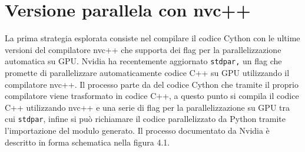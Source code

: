 \documentclass[12pt,a4paper]{report}
\begin{document}
\chapter{Versione parallela con nvc++} 
La prima strategia esplorata consiste nel compilare il codice Cython con le ultime versioni del compilatore nvc++ che supporta dei flag per la parallelizzazione automatica su GPU.  Nvidia ha recentemente aggiornato \verb|stdpar,|  un flag che promette di parallelizzare automaticamente codice C++ su GPU utilizzando il compilatore nvc++. \newline
Il processo parte da del codice Cython che tramite il proprio compilatore viene trasformato in codice C++,  a questo punto si compila il codice C++ utilizzando nvc++ e una serie di flag per la parallelizzazione su GPU tra cui \verb|stdpar|, infine si può richiamare il codice parallelizzato da Python tramite l'importazione del modulo generato. \newline
Il processo documentato da Nvidia è descritto in forma schematica nella figura 4.1.
\begin{figure}[H]
\centering
\begin{floatrow}[1]
\end{floatrow}
\end{figure} \newpage
\end{document}
